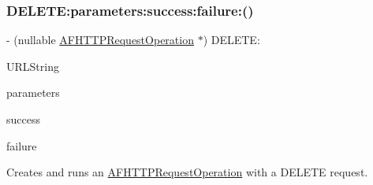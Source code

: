 \subsubsection{\texorpdfstring{D\+E\+L\+E\+T\+E\+:parameters\+:success\+:failure\+:()}{DELETE:parameters:success:failure:()}\hspace{0.1cm}{\footnotesize\ttfamily [3/3]}}
{\footnotesize\ttfamily -\/ (nullable \mbox{\hyperlink{interface_a_f_h_t_t_p_request_operation}{A\+F\+H\+T\+T\+P\+Request\+Operation}} $\ast$) D\+E\+L\+E\+T\+E\+: \begin{DoxyParamCaption}\item[{(N\+S\+String $\ast$)}]{U\+R\+L\+String }\item[{parameters:(nullable id)}]{parameters }\item[{success:(nullable void($^\wedge$)(\mbox{\hyperlink{interface_a_f_h_t_t_p_request_operation}{A\+F\+H\+T\+T\+P\+Request\+Operation}} $\ast$operation, id response\+Object))}]{success }\item[{failure:(nullable void($^\wedge$)(\mbox{\hyperlink{interface_a_f_h_t_t_p_request_operation}{A\+F\+H\+T\+T\+P\+Request\+Operation}} $\ast$\+\_\+\+\_\+nullable operation, N\+S\+Error $\ast$error))}]{failure }\end{DoxyParamCaption}}

Creates and runs an {\ttfamily \mbox{\hyperlink{interface_a_f_h_t_t_p_request_operation}{A\+F\+H\+T\+T\+P\+Request\+Operation}}} with a {\ttfamily D\+E\+L\+E\+TE} request.


